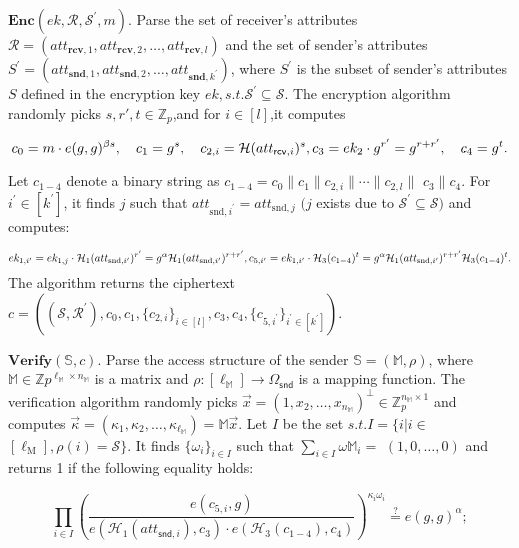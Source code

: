 \documentclass[runningheads]{llncs}
\begin{document}
$\mathbf{Enc}(ek,\mathcal{R},\mathcal{S}^{\prime},m).$ Parse the set of receiver's attributes $\mathcal{R}=(att_{\mathbf{rcv},1},att_{\mathbf{rcv},2},\ldots,att_{\mathbf{rcv},l})$ and the set of sender's attributes $S^\prime=(att_{\mathbf{snd},1},att_{\mathbf{snd},2},\ldots,att_{\mathbf{snd},k^{\prime}})$, where $S^\prime$ is the subset of sender's attributes $S$ defined in the encryption key $ek,s.t.\mathcal{S}^{\prime}\subseteq\mathcal{S}.$ The encryption algorithm randomly picks $s,r',t\in\mathbb{Z}_p$,and for $i\in[l]$,it computes

$$c_0=m\cdot e(g,g)^{\beta s},\quad c_1=g^s,\quad c_{2,i}=\mathcal{H}(att_{\mathsf{rcv},i})^s,
\\c_3=ek_2\cdot g^{r^{\prime}}=g^{r+r^{\prime}},\quad c_4=g^t.$$

Let $c_{1-4}$ denote a binary string as $c_{1-4}=c_0\|c_1\|c_{2,i}\|\cdots\|c_{2,l}\|$ $c_{3}\|c_{4}.$ For $i^\prime\in[k^{\prime}]$, it finds $j$ such that $att_{\mathrm{snd},i^{\prime}}=att_{\mathrm{snd},j}$ $(j$ exists due to $\mathcal{S}^\prime\subseteq\mathcal{S})$ and computes:

$$ek_{1,i^{\prime}}=ek_{1,j}\cdot\mathcal{H}_{1}(att_{\mathrm{snd},i^{\prime}})^{r^{\prime}}=g^{\alpha}\mathcal{H}_{1}(att_{\mathrm{snd},i^{\prime}})^{r+r^{\prime}},
\\c_{5,i^{\prime}}=ek_{1,i^{\prime}}\cdot\mathcal{H}_{3}(c_{1-4})^{t}=g^{\alpha}\mathcal{H}_{1}(att_{\mathrm{snd},i^{\prime}})^{r+r^{\prime}}\mathcal{H}_{3}(c_{1-4})^{t}.$$
The algorithm returns the ciphertext $c=((\mathcal{S},\mathcal{R}^{\prime}),c_{0},c_{1},\{c_{2,i}\}_{i\in[l]},c_{3},c_{4},\{c_{5,i^{\prime}}\}_{i^{\prime}\in[k^{\prime}]})$.

$\mathbf{Verify}(\mathbb{S},c).$ Parse the access structure of the sender $\mathbb{S}=(\mathbb{M},\rho)$, where $\mathbb{M}\in\mathbb{Z}p^{\ell_{\mathbb{M}}\times n_{\mathbb{M}}}$ is a matrix and $\rho:[\ell_\mathbb{M}]\to \Omega_\mathsf{snd}$ is a mapping function. The verification algorithm randomly picks $\vec{x}=(1,x_{2},\ldots,x_{n_{\mathbb{M}}})^{\perp}\in\mathbb{Z}_{p}^{n_{\mathbb{M}}\times1}$ and computes
$\vec{\kappa}=(\kappa_1,\kappa_2,\ldots,\kappa_{\ell_{\mathbb{M}}})=\mathbb{M}\vec{x}.$ Let $I$ be the set $s.t.I=\{i|i\in$ $[ \ell_{\mathrm{M} }] , \rho ( i) = \mathcal{S} \} .$ It finds $\{\omega_i\}_{i\in I}$ such that $\sum_{i\in I}\omega\mathbb{M}_i=$ $(1,0,\ldots,0)$ and returns 1 if the following equality holds:

$$\prod_{i\in I}\left(\frac{e(c_{5,i},g)}{e(\mathcal{H}_1(att_{\mathsf{snd},i}),c_3)\cdot e(\mathcal{H}_3(c_{1-4}),c_4)}\right)^{\kappa_i\omega_i}\overset{?}{\operatorname*{=}}e(g,g)^\alpha;$$
\end{document}

